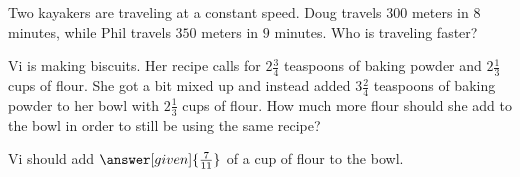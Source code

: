 \documentclass[nooutcomes]{ximera}
\begin{document}
\begin{problem}
Two kayakers are traveling at a constant speed.  Doug travels $300$ meters in $8$ minutes, while Phil travels $350$ meters in $9$ minutes.  Who is traveling faster?

\begin{multipleChoice}
\end{multipleChoice}
\end{problem}


\begin{problem}
Vi is making biscuits.  Her recipe calls for $2 \frac{3}{4}$ teaspoons of baking powder and $2 \frac{1}{3}$ cups of flour.  She got a bit mixed up and instead added $3 \frac{2}{4}$ teaspoons of baking powder to her bowl with $2 \frac{1}{3}$ cups of flour.  How much more flour should she add to the bowl in order to still be using the same recipe?

\begin{prompt}
 Vi should add $\answer[given]{\frac{7}{11}}$ of a cup of flour to the bowl.
\end{prompt}
\end{problem}
\end{document}
